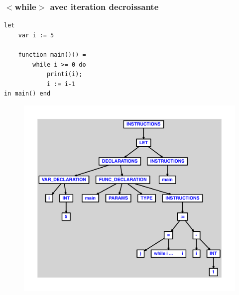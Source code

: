 \documentclass{article}
\begin{document}
\subsubsection{$ < $while$ > $ avec iteration decroissante}
\begin{lstlisting}
let
	var i := 5

	function main()() =
		while i >= 0 do
			printi(i);
			i := i-1
in main() end
\end{lstlisting}
\newpage
\begin{figure}[H]
\centering
\includegraphics[max width=\textwidth]{ast/ast_330.pdf}
\end{figure}
\newpage
\end{document}
